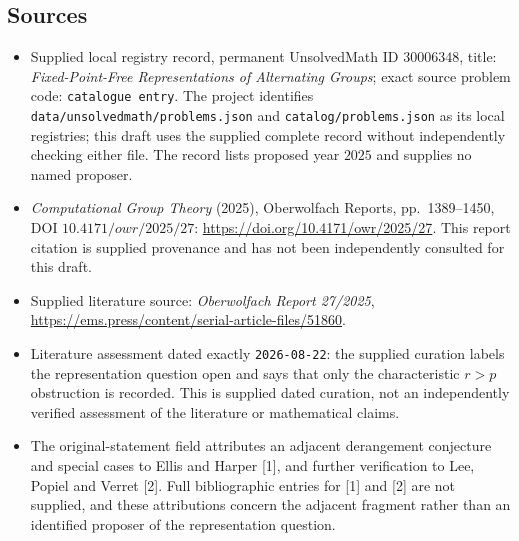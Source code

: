 \documentclass[11pt]{article}
\begin{document}
\subsection{Sources}
\begin{itemize}
\item Supplied local registry record, permanent UnsolvedMath ID \(30006348\), title: \emph{Fixed-Point-Free Representations of Alternating Groups}; exact source problem code: \texttt{catalogue entry}. The project identifies \texttt{data/unsolvedmath/problems.json} and \texttt{catalog/problems.json} as its local registries; this draft uses the supplied complete record without independently checking either file. The record lists proposed year \(2025\) and supplies no named proposer.
\item \emph{Computational Group Theory} (2025), Oberwolfach Reports, pp.\ 1389--1450, DOI \(10.4171/owr/2025/27\): \url{https://doi.org/10.4171/owr/2025/27}. This report citation is supplied provenance and has not been independently consulted for this draft.
\item Supplied literature source: \emph{Oberwolfach Report 27/2025}, \url{https://ems.press/content/serial-article-files/51860}.
\item Literature assessment dated exactly \texttt{2026-08-22}: the supplied curation labels the representation question open and says that only the characteristic \(r>p\) obstruction is recorded. This is supplied dated curation, not an independently verified assessment of the literature or mathematical claims.
\item The original-statement field attributes an adjacent derangement conjecture and special cases to Ellis and Harper [1], and further verification to Lee, Popiel and Verret [2]. Full bibliographic entries for [1] and [2] are not supplied, and these attributions concern the adjacent fragment rather than an identified proposer of the representation question.
\end{itemize}
\end{document}
